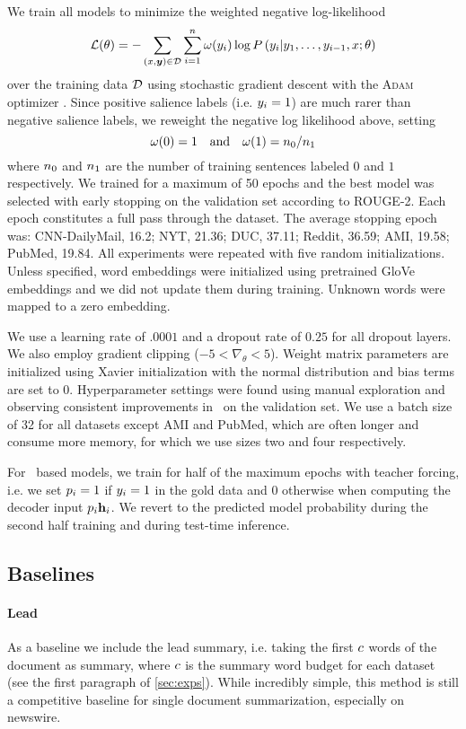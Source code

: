 We train all models to minimize the weighted negative log-likelihood
\[\mathcal{L(\theta)} = -\sum_{(x,\boldsymbol{y}) \in \mathcal{D} } \sum_{i=1}^n \omega(y_i) \log P\left(y_i|y_1,\ldots,y_{i-1},x;\theta\right) \]
over the training data $\mathcal{D}$ using stochastic gradient descent with the
\textsc{Adam} optimizer \citep{kingma2014adam}. Since positive salience labels
(i.e. $y_i = 1$) are much rarer than negative salience labels, we reweight
the negative log likelihood above, setting
\[\omega(0)=1 \quad \textrm{and}\quad \omega(1) = n_0/n_1\] 
where $n_0$ and $n_1$ 
are the number of training sentences labeled $0$ and $1$ respectively.  We
trained for a maximum of 50 epochs and the best model was selected with early
stopping on the validation set according to ROUGE-2. Each epoch constitutes a
full pass through the dataset. The average stopping epoch was: CNN-DailyMail,
16.2; NYT, 21.36; DUC, 37.11; Reddit, 36.59; AMI, 19.58; PubMed, 19.84.  All
experiments were repeated with five random initializations.     Unless
specified, word embeddings were initialized using pretrained GloVe embeddings
\citep{pennington2014glove} and we did not update them during training. Unknown
words were mapped to a zero embedding.

We use a learning rate of $.0001$ and a dropout rate of $0.25$ for all dropout
layers. We also employ gradient clipping ($-5 < \nabla_\theta < 5$).  Weight
matrix parameters are initialized using Xavier initialization with the normal
distribution \citep{glorot2010understanding} and bias terms are set to $0$.
Hyperparameter settings were found using manual exploration and observing
consistent improvements in \rouge~on the validation set.  We use a batch size
of 32 for all datasets except AMI and PubMed, which are often longer and
consume more memory, for which we use sizes two and four respectively.

For \clext~based models, we train for half of the maximum epochs with teacher
forcing, i.e. we set $p_i = 1$ if $y_i = 1$ in the gold data and $0$
otherwise when computing the decoder input $p_i \mathbf{h}_i$. We revert to
the predicted model probability during the second half training and during
test-time inference.

\subsection{Baselines}

\paragraph{Lead} As a baseline we include the lead summary, i.e. taking the
first $c$ words of the document as summary, where $c$ is
the summary word budget for each dataset (see the first paragraph of
\autoref{sec:exps}). While incredibly simple, this method is still a
competitive baseline for single document summarization, especially on newswire.


